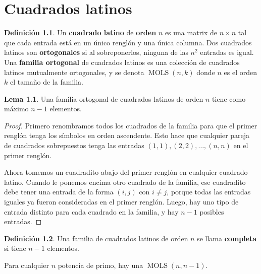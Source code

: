 \documentclass[spanish]{book}
\theoremstyle{definition}
\newtheorem*{defn}{Definición}
\newtheorem*{lema}{Lema}
\DeclareMathOperator{\MOLS}{MOLS}
\begin{document}
\chapter{Cuadrados latinos}
\begin{defn}
	Un \textbf{cuadrado latino} de \textbf{orden} $n$ es una matrix de $n\times n$ tal que cada entrada está en un único renglón y una única columna. Dos cuadrados latinos son \textbf{ortogonales} si al sobreponerlos, ninguna de las $n^2$ entradas es igual. Una \textbf{familia ortogonal} de cuadrados latinos es una colección de cuadrados latinos mutualmente ortogonales, y se denota $\MOLS(n,k)$ donde $n$ es el orden $k$ el tamaño de la familia.
\end{defn}
\begin{lema}
	Una familia ortogonal de cuadrados latinos de orden $n$ tiene como máximo $n-1$ elementos.
\end{lema}
\begin{proof}
	Primero renombramos todos los cuadrados de la familia para que el primer renglón tenga los símbolos en orden ascendente. Esto hace que cualquier pareja de cuadrados sobrepuestos tenga las entradas $(1,1),(2,2),\ldots,(n,n)$ en el primer renglón.
	
	Ahora tomemos un cuadradito abajo del primer renglón en cualquier cuadrado latino. Cuando le ponemos encima otro cuadrado de la familia, ese cuadradito debe tener una entrada de la forma $(i,j)$ con $i\neq j$, porque todas las entradas iguales ya fueron consideradas en el primer renglón. Luego, hay uno tipo de entrada distinto para cada cuadrado en la familia, y hay $n-1$ posibles entradas.
\end{proof}
\begin{defn}
	Una familia de cuadrados latinos de orden $n$ se llama \textbf{completa} si tiene $n-1$ elementos. 
\end{defn}
\begin{teo}
	Para cualquier $n$ potencia de primo, hay una $\MOLS(n,n-1)$.
\end{teo}
\end{document}
